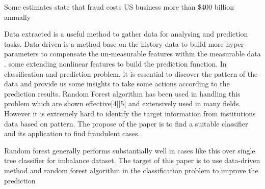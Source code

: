 





Some estimates state that fraud costs US business more than \$400 billion annually

Data extracted is a useful method to gather data for analysing and prediction tasks. Data driven is a method base on the history data to build more hyper-parameters to compensate the un-measurable features within the measurable data \cite{SMARRA20181252}. some extending nonlinear features to build the prediction function. In classification and prediction problem, it is essential to discover the pattern of the data and provide us some insights to take some actions according to the prediction results. Random Forest algorithm has been used in handling this problem which are shown effective[4][5] and extensively used in many fields. However it is extremely hard to identify the target information from institutions data based on pattern. The propose of the paper is to find a suitable classifier and its application to find fraudulent cases. 

Random forest generally performs substantially well in cases like this over single tree classifier for imbalance dataset. The target of this paper is to use data-driven method and random forest algorithm in the classification problem to improve the prediction